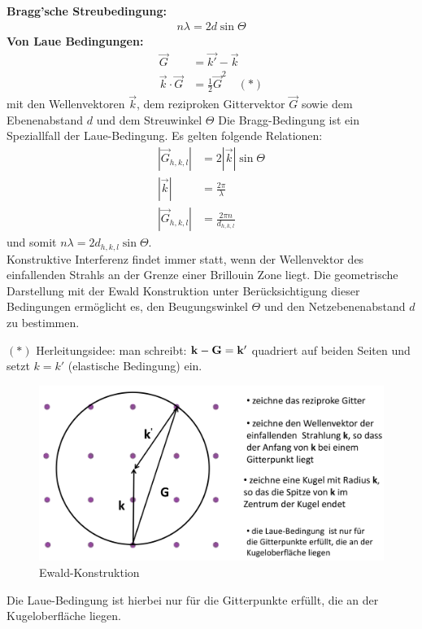 \textbf{Bragg'sche Streubedingung:}
\begin{align}
    n\lambda = 2 d \sin{\Theta} 
\end{align}
\textbf{Von Laue Bedingungen:}
\begin{align}
\vec{G} &= \vec{k'} - \vec{k} \\
\vec{k} \cdot \vec{G} &= \frac{1}{2} \vec{G}^2 \quad (*)
\end{align}
mit den Wellenvektoren $\vec{k}$, dem reziproken Gittervektor $\vec{G}$ sowie dem Ebenenabstand $d$ und dem Streuwinkel $\Theta$ Die Bragg-Bedingung ist ein Speziallfall der Laue-Bedingung. Es gelten folgende Relationen:
\begin{align}
    |\vec{G}_{h,k,l}| &= 2 |\vec{k}| \sin{\Theta} \\
    |\vec{k}| &= \frac{2 \pi}{\lambda} \\
    |\vec{G}_{h,k,l}| &= \frac{2 \pi n}{ d_{h,k,l}}
\end{align}
und somit $n \lambda = 2 d_{h,k,l}  \sin{\Theta}$. \\
Konstruktive Interferenz findet immer statt, wenn der Wellenvektor des
einfallenden Strahls an der Grenze einer Brillouin Zone liegt. Die geometrische Darstellung mit der Ewald Konstruktion unter Berücksichtigung dieser Bedingungen ermöglicht es, den Beugungswinkel $\Theta$ und den Netzebenenabstand $d$ zu bestimmen. 

$(*)$ Herleitungsidee: man schreibt: $\vb{k}-\vb{G} = \vb{k'}$ quadriert auf beiden Seiten und setzt $k=k'$ (elastische Bedingung) ein. 

\begin{figure}[H]
    \centering
    \begin{samepage}
        \includegraphics[width=0.8\linewidth]{resources/09-05-2012/Ewald_Konstruktion.png}
        \caption{Ewald-Konstruktion}
    \end{samepage}
\end{figure}

Die Laue-Bedingung ist hierbei nur für die Gitterpunkte erfüllt, die an der Kugeloberfläche liegen. 


